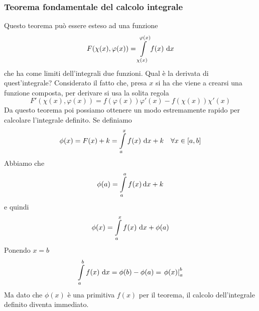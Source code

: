 \subsubsection{Teorema fondamentale del calcolo integrale}
Questo teorema può essere esteso ad una funzione
\begin{equation*}
  F(\chi(x),\varphi(x)) = \int\limits_{\chi(x)}^{\varphi(x)} f(x)\,\mathop{}\!\mathrm{d} x
\end{equation*}
che ha come limiti dell'integrali due funzioni. Qual è la derivata di quest'integrale? Considerato
il fatto che, presa $x$ si ha che viene a crearsi una funzione composta, per derivare si usa la
solita regola
\begin{equation*}
  F'(\chi(x),\varphi(x)) = f(\varphi(x))\varphi'(x) - f(\chi(x))\chi'(x)
\end{equation*}
Da questo teorema poi possiamo ottenere un modo estremamente rapido per calcolare l'integrale 
definito. Se definiamo
\begin{equation*}
  \phi(x) = F(x)+k = \int\limits_{a}^{x} f(x)\,\mathop{}\!\mathrm{d} x+k\quad\forall x\in[a,b]
\end{equation*}
Abbiamo che
\begin{equation*}
  \phi(a) = \int\limits_{a}^{a} f(x)\mathop{}\!\mathrm{d} x+k
\end{equation*}
e quindi
\begin{equation*}
  \phi(x)=\int\limits_{a}^{x} f(x)\,\mathop{}\!\mathrm{d} x+\phi(a)
\end{equation*}
Ponendo $x=b$
\begin{equation*}
\int\limits_{a}^{b}f(x)\,\mathop{}\!\mathrm{d} x=\phi(b)-\phi(a)=\left.\phi(x)\right|_a^b
\end{equation*}
Ma dato che $\phi(x)$ è una primitiva $f(x)$ per il teorema, il calcolo dell'integrale
definito diventa immediato.

